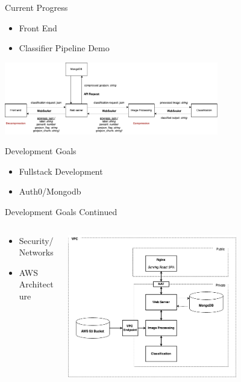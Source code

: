 
\begin{frame}{Current Progress}
    \begin{itemize}
        \item Front End
        \item Classifier Pipeline Demo 
    \end{itemize}
    \centering
    \includegraphics[height=0.7\textheight,width=0.7\textwidth,keepaspectratio]{images/mm_websockets.png}
\end{frame}

\begin{frame}{Development Goals}
    \begin{itemize}
        \item Fullstack Development
        \item Auth0/Mongodb
    \end{itemize}
\end{frame}

\begin{frame}{Development Goals Continued}
        \begin{columns}
        \begin{column}{0.5\textwidth}
            \begin{itemize}
                \item Security/Networks
                \item AWS Architecture
            \end{itemize}
        \end{column}
        \begin{column}{0.5\textwidth}
            \includegraphics[height=0.7\textheight,width=0.7\textwidth,keepaspectratio]{images/mm_system.png}
        \end{column}
    \end{columns}
\end{frame}

